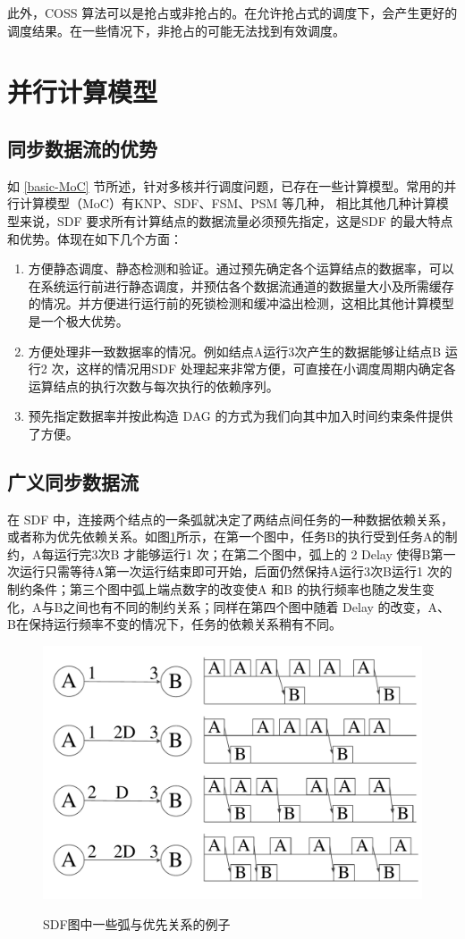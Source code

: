 此外，COSS 算法可以是抢占或非抢占的。在允许抢占式的调度下，会产生更好的调度结果。在一些情况下，非抢占的可能无法找到有效调度。


\section{并行计算模型}

\subsection{同步数据流的优势}
如 \ref{basic-MoC} 节所述，针对多核并行调度问题，已存在一些计算模型。常用的并行计算模型（MoC）有KNP、SDF、FSM、PSM 等几种，%
相比其他几种计算模型来说，SDF 要求所有计算结点的数据流量必须预先指定，这是SDF 的最大特点和优势。体现在如下几个方面：
\begin{enumerate}
  \item 方便静态调度、静态检测和验证。通过预先确定各个运算结点的数据率，可以在系统运行前进行静态调度，并预估各个数据流通道的数据量大小及所需缓存的情况。并方便进行运行前的死锁检测和缓冲溢出检测，这相比其他计算模型是一个极大优势。
  \item 方便处理非一致数据率的情况。例如结点A运行3次产生的数据能够让结点B 运行2 次，这样的情况用SDF 处理起来非常方便，可直接在小调度周期内确定各运算结点的执行次数与每次执行的依赖序列。
  \item 预先指定数据率并按此构造 DAG 的方式为我们向其中加入时间约束条件提供了方便。
\end{enumerate}

\subsection{广义同步数据流}

在 SDF 中，连接两个结点的一条弧就决定了两结点间任务的一种数据依赖关系，或者称为优先依赖关系。如图\ref{SDF-fig-VArc}所示，在第一个图中，任务B的执行受到任务A的制约，A每运行完3次B 才能够运行1 次；在第二个图中，弧上的 2 Delay 使得B第一次运行只需等待A第一次运行结束即可开始，后面仍然保持A运行3次B运行1 次的制约条件；第三个图中弧上端点数字的改变使A 和B 的执行频率也随之发生变化，A与B之间也有不同的制约关系；同样在第四个图中随着 Delay 的改变，A、B在保持运行频率不变的情况下，任务的依赖关系稍有不同。

\begin{figure}[!hbt]
  \centering
  \includegraphics[height=30ex]{figure/SDF-VArc.pdf}\\
  \caption{SDF图中一些弧与优先关系的例子}\label{SDF-fig-VArc}
\end{figure}

